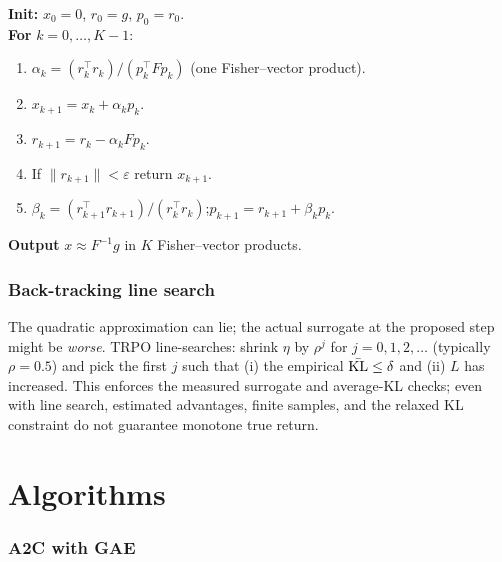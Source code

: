 \documentclass[11pt,oneside]{scrbook}
\begin{document}
\begin{tcolorbox}[colback=rlbg, colframe=rlblue, title=\textbf{Conjugate-gradient solve of $Fx = g$}]
\textbf{Init:} $x_0 = 0$, $r_0 = g$, $p_0 = r_0$.\\
\textbf{For} $k=0,\ldots,K-1$:
\begin{enumerate}[leftmargin=*]
  \item $\alpha_k = (r_k^\top r_k) / (p_k^\top F p_k)$ \quad (one Fisher--vector product).
  \item $x_{k+1} = x_k + \alpha_k p_k$.
  \item $r_{k+1} = r_k - \alpha_k F p_k$.
  \item If $\|r_{k+1}\| < \varepsilon$ return $x_{k+1}$.
  \item $\beta_k = (r_{k+1}^\top r_{k+1}) / (r_k^\top r_k)$;\quad $p_{k+1} = r_{k+1} + \beta_k p_k$.
\end{enumerate}
\textbf{Output} $x \approx F^{-1} g$ in $K$ Fisher--vector products.
\end{tcolorbox}

\subsection*{Back-tracking line search}

The quadratic approximation can lie; the actual surrogate at the proposed step might be \emph{worse}. TRPO line-searches: shrink $\eta$ by $\rho^j$ for $j=0,1,2,\ldots$ (typically $\rho=0.5$) and pick the first $j$ such that (i) the empirical $\bar{\mathrm{KL}} \le \delta$ and (ii) $L$ has increased. This enforces the measured surrogate and average-KL checks; even with
line search, estimated advantages, finite samples, and the relaxed KL
constraint do not guarantee monotone true return.

\chapter{Algorithms}

\subsection*{A2C with GAE}
\end{document}
